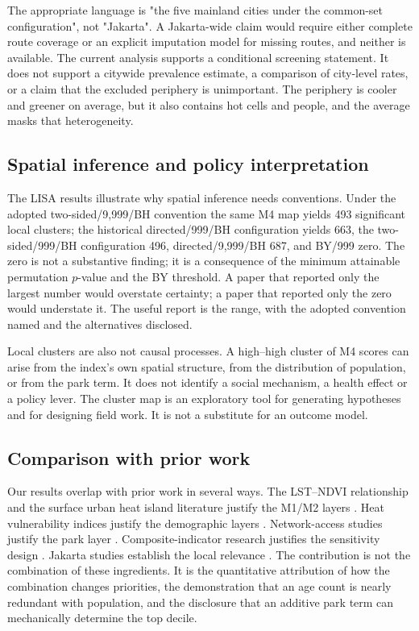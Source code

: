\documentclass[times,twoside]{_Templates/MultiTargetManuscript}
\begin{document}
The appropriate language is "the five mainland cities under the common-set
configuration", not "Jakarta". A Jakarta-wide claim would require either
complete route coverage or an explicit imputation model for missing routes, and
neither is available. The current analysis supports a conditional screening
statement. It does not support a citywide prevalence estimate, a comparison of
city-level rates, or a claim that the excluded periphery is unimportant. The
periphery is cooler and greener on average, but it also contains hot cells and
people, and the average masks that heterogeneity.

\subsection{Spatial inference and policy interpretation}

The LISA results illustrate why spatial inference needs conventions. Under the
adopted two-sided/9,999/BH convention the same M4 map yields 493 significant
local clusters; the historical directed/999/BH configuration yields 663, the
two-sided/999/BH configuration 496, directed/9,999/BH 687, and BY/999 zero. The
zero is not a substantive finding; it is a consequence of the minimum attainable
permutation $p$-value and the BY threshold. A paper that reported only the
largest number would overstate certainty; a paper that reported only the zero
would understate it. The useful report is the range, with the adopted convention
named and the alternatives disclosed.

Local clusters are also not causal processes. A high--high cluster of M4 scores
can arise from the index's own spatial structure, from the distribution of
population, or from the park term. It does not identify a social mechanism, a
health effect or a policy lever. The cluster map is an exploratory tool for
generating hypotheses and for designing field work. It is not a substitute for
an outcome model.

\subsection{Comparison with prior work}

Our results overlap with prior work in several ways. The LST--NDVI relationship
and the surface urban heat island literature justify the M1/M2 layers
\citep{oke1982,voogt2003,weng2004,estoque2017}. Heat vulnerability indices
justify the demographic layers \citep{reid2009,wolf2013}. Network-access studies
justify the park layer \citep{oh2007,kim2026,feng2019}. Composite-indicator
research justifies the sensitivity design \citep{saisana2005,paruolo2013,greco2019}.
Jakarta studies establish the local relevance
\citep{siswanto2023,putra2021,rizki2024,varquez2020}. The contribution is not
the combination of these ingredients. It is the quantitative attribution of how
the combination changes priorities, the demonstration that an age count is
nearly redundant with population, and the disclosure that an additive park term
can mechanically determine the top decile.
\end{document}

